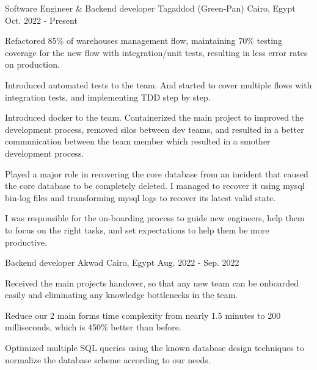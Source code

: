 

\begin{cventries}

  \cventry
    {Software Engineer \& Backend developer} %
    {Tagaddod (Green-Pan)} %
    {Cairo, Egypt} %
    {Oct. 2022 - Present} %
    {
      \begin{cvitems} %
        \item {Refactored 85\% of warehouses management flow, maintaining 70\% testing coverage for the new flow with integration/unit tests, resulting in less error rates on production.}
        \item {Introduced automated tests to the team. And started to cover multiple flows with integration tests, and implementing TDD step by step.}
        \item {Introduced docker to the team. Containerized the main project to improved the development process, removed silos between dev teams, and resulted in a better communication between the team member which resulted in a smother development process.}
        \item {Played a major role in recovering the core database from an incident that caused the core database to be completely deleted. I managed to recover it using mysql bin-log files and transforming mysql logs to recover its latest valid state.
              }
        \item {I was responsible for the on-boarding process to guide new engineers, help them to focus on the right tasks, and set expectations to help them be more productive.}
      \end{cvitems}
    }

  \cventry
    {Backend developer} %
    {Akwad} %
    {Cairo, Egypt} %
    {Aug. 2022 - Sep. 2022} %
    {
      \begin{cvitems} %
        \item {Received the main projects handover, so that any new team can be onboarded easily and eliminating any knowledge bottlenecks in the team.}
        \item {Reduce our 2 main forms time complexity from nearly 1.5 minutes to 200 milliseconds, which is 450\% better than before.}
        \item {Optimized multiple SQL queries using the known database design techniques to normalize the database scheme according to our needs.}
      \end{cvitems}
    }


\end{cventries}
